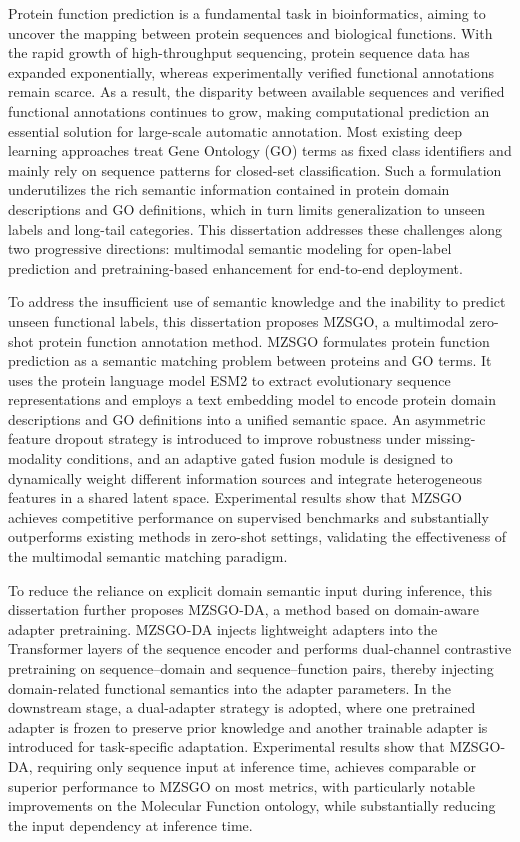 \begin{eabstract}

Protein function prediction is a fundamental task in bioinformatics, aiming to uncover the mapping between protein sequences and biological functions. With the rapid growth of high-throughput sequencing, protein sequence data has expanded exponentially, whereas experimentally verified functional annotations remain scarce. As a result, the disparity between available sequences and verified functional annotations continues to grow, making computational prediction an essential solution for large-scale automatic annotation. Most existing deep learning approaches treat Gene Ontology (GO) terms as fixed class identifiers and mainly rely on sequence patterns for closed-set classification. Such a formulation underutilizes the rich semantic information contained in protein domain descriptions and GO definitions, which in turn limits generalization to unseen labels and long-tail categories. This dissertation addresses these challenges along two progressive directions: multimodal semantic modeling for open-label prediction and pretraining-based enhancement for end-to-end deployment.

To address the insufficient use of semantic knowledge and the inability to predict unseen functional labels, this dissertation proposes MZSGO, a multimodal zero-shot protein function annotation method. MZSGO formulates protein function prediction as a semantic matching problem between proteins and GO terms. It uses the protein language model ESM2 to extract evolutionary sequence representations and employs a text embedding model to encode protein domain descriptions and GO definitions into a unified semantic space. An asymmetric feature dropout strategy is introduced to improve robustness under missing-modality conditions, and an adaptive gated fusion module is designed to dynamically weight different information sources and integrate heterogeneous features in a shared latent space. Experimental results show that MZSGO achieves competitive performance on supervised benchmarks and substantially outperforms existing methods in zero-shot settings, validating the effectiveness of the multimodal semantic matching paradigm.

To reduce the reliance on explicit domain semantic input during inference, this dissertation further proposes MZSGO-DA, a method based on domain-aware adapter pretraining. MZSGO-DA injects lightweight adapters into the Transformer layers of the sequence encoder and performs dual-channel contrastive pretraining on sequence--domain and sequence--function pairs, thereby injecting domain-related functional semantics into the adapter parameters. In the downstream stage, a dual-adapter strategy is adopted, where one pretrained adapter is frozen to preserve prior knowledge and another trainable adapter is introduced for task-specific adaptation. Experimental results show that MZSGO-DA, requiring only sequence input at inference time, achieves comparable or superior performance to MZSGO on most metrics, with particularly notable improvements on the Molecular Function ontology, while substantially reducing the input dependency at inference time.


\end{eabstract}
